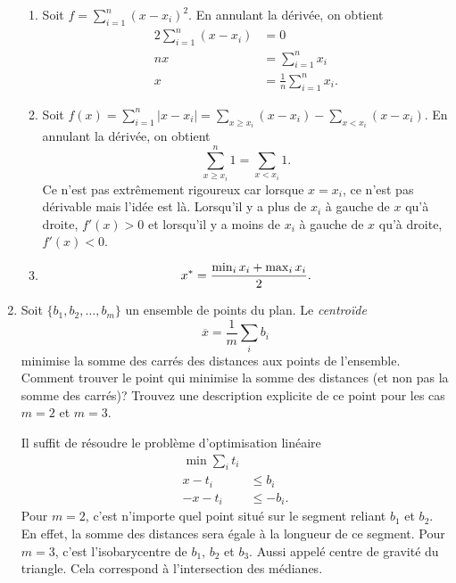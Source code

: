\begin{enumerate}
    \begin{solution}
      \begin{enumerate}
        \item
          Soit $f = \sum_{i=1}^{n}(x-x_{i})^{2}$.
          En annulant la dérivée, on obtient
          \begin{align*}
            2\sum_{i=1}^{n}(x-x_{i}) & = 0\\
            nx & = \sum_{i=1}^{n} x_{i}\\
            x & = \frac{1}{n}\sum_{i=1}^{n} x_{i}.
          \end{align*}
        \item
          Soit $f(x) = \sum_{i=1}^{n} |x-x_{i}| = \sum_{x \geq x_{i}}
          (x-x_{i}) - \sum_{x < x_{i}} (x-x_{i})$.
          En annulant la dérivée, on obtient
          \[ \sum_{x \geq x_i}^n 1 = \sum_{x < x_i} 1. \]
          Ce n'est pas extrêmement rigoureux car lorsque
          $x = x_i$, ce n'est pas dérivable mais l'idée est là.
          Lorsqu'il y a plus de $x_i$ à gauche de $x$ qu'à droite,
          $f'(x) > 0$ et
          lorsqu'il y a moins de $x_i$ à gauche de $x$ qu'à droite,
          $f'(x) < 0$.
        \item
          \[ x^* = \frac{\min_i x_i + \max_i x_i}{2}. \]
      \end{enumerate}
    \end{solution}



  \item  Soit $\{b_1, b_2, \ldots, b_m\}$ un ensemble de points du plan. Le \emph{centro\"ide}
    $$\overline x = \frac{1}{m} \sum_i b_i$$
    minimise la somme des carrés des distances aux points de l'ensemble. Comment trouver le point qui minimise la somme des distances (et
    non pas la somme des carrés)? Trouvez une description explicite de ce point pour les cas $m=2$ et $m=3$.

    \begin{solution}
      Il suffit de résoudre le problème d'optimisation linéaire
      \begin{align*}
        \min \sum_i t_i\\
        x - t_i & \leq b_i\\
        -x - t_i & \leq -b_i.
      \end{align*}
      Pour $m = 2$, c'est n'importe quel point situé sur le segment reliant $b_1$ et $b_2$. En effet, la somme des distances sera égale à la longueur de ce segment.
      Pour $m = 3$, c'est l'isobarycentre de $b_1$, $b_2$ et $b_3$.
      Aussi appelé centre de gravité du triangle. Cela correspond à l'intersection des médianes.
    \end{solution}





\end{enumerate}
